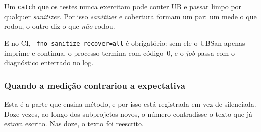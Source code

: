 \begin{armadilha}
Um \texttt{catch} que os testes nunca exercitam pode conter UB e passar limpo
por qualquer \emph{sanitizer}. Por isso \emph{sanitizer} e cobertura formam um
par: um mede o que rodou, o outro diz o que \emph{não} rodou.

E no CI, \texttt{-fno-sanitize-recover=all} é obrigatório: sem ele o UBSan
apenas imprime e continua, o processo termina com código~0, e o \emph{job} passa
com o diagnóstico enterrado no log.
\end{armadilha}

\subsubsection{Quando a medição contrariou a expectativa}

Esta é a parte que ensina método, e por isso está registrada em vez de
silenciada. Doze vezes, ao longo dos subprojetos novos, o número contradisse o
texto que já estava escrito. Nas doze, o texto foi reescrito.

